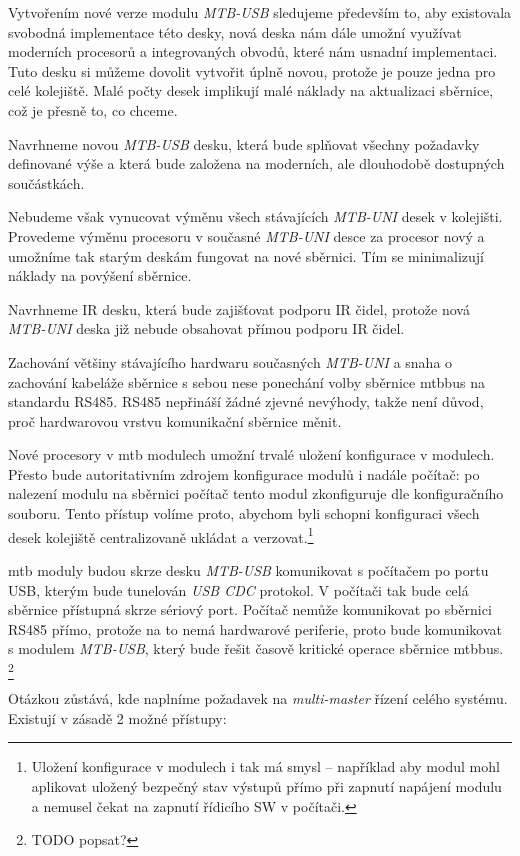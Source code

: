 Vytvořením nové verze modulu \textit{MTB-USB} sledujeme především to, aby
existovala svobodná implementace této desky, nová deska nám dále umožní využívat
moderních procesorů a integrovaných obvodů, které nám usnadní implementaci.
Tuto desku si můžeme dovolit vytvořit úplně novou, protože je pouze jedna
pro celé kolejiště. Malé počty desek implikují malé náklady na aktualizaci
sběrnice, což je přesně to, co chceme.

Navrhneme novou \textit{MTB-USB} desku, která bude splňovat všechny požadavky
definované výše a která bude založena na moderních, ale dlouhodobě dostupných
součástkách.

Nebudeme však vynucovat výměnu všech stávajících \textit{MTB-UNI} desek v
kolejišti. Provedeme výměnu procesoru v současné \textit{MTB-UNI} desce za
procesor nový a umožníme tak starým deskám fungovat na nové sběrnici. Tím se
minimalizují náklady na povýšení sběrnice.

Navrhneme IR desku, která bude zajišťovat podporu IR čidel, protože nová
\textit{MTB-UNI} deska již nebude obsahovat přímou podporu IR čidel.

Zachování většiny stávajícího hardwaru současných \textit{MTB-UNI} a snaha o
zachování kabeláže sběrnice s sebou nese ponechání volby sběrnice \gls{mtbbus}
na standardu RS485. RS485 nepřináší žádné zjevné nevýhody, takže není důvod,
proč hardwarovou vrstvu komunikační sběrnice měnit.

Nové procesory v \gls{mtb} modulech umožní trvalé uložení konfigurace v modulech.
Přesto bude autoritativním zdrojem konfigurace modulů i nadále počítač: po
nalezení modulu na sběrnici počítač tento modul zkonfiguruje dle konfiguračního
souboru. Tento přístup volíme proto, abychom byli schopni konfiguraci všech
desek kolejiště centralizovaně ukládat a verzovat.\footnote{Uložení konfigurace
v modulech i tak má smysl – například aby modul mohl aplikovat uložený bezpečný
stav výstupů přímo při zapnutí napájení modulu a nemusel čekat na zapnutí
řídicího SW v počítači.}

\gls{mtb} moduly budou skrze desku \textit{MTB-USB} komunikovat s počítačem
po portu USB, kterým bude tunelován \textit{USB CDC} protokol. V počítači tak
bude celá sběrnice přístupná skrze sériový port. Počítač nemůže komunikovat
po sběrnici RS485 přímo, protože na to nemá hardwarové periferie, proto bude
komunikovat s modulem \textit{MTB-USB}, který bude řešit časově kritické operace
sběrnice \gls{mtbbus}. \footnote{TODO popsat?}

Otázkou zůstává, kde naplníme požadavek na \textit{multi-master} řízení celého
systému. Existují v zásadě 2 možné přístupy:

